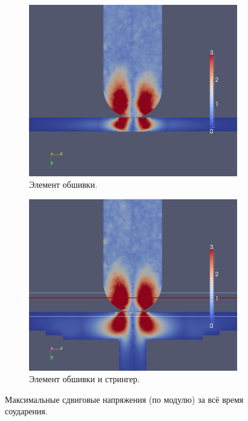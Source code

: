 \begin{figure}[htp]
\begin{subfigure}[b]{0.5\textwidth}
\centering
\includegraphics[width=\textwidth]{png/pkm-experiment/wing-only/shear.png}
\caption{Элемент обшивки.}
\end{subfigure}
\begin{subfigure}[b]{0.5\textwidth}
\centering
\includegraphics[width=\textwidth]{png/pkm-experiment/wing-stringer/shear.png}
\caption{Элемент обшивки и стрингер.}
\end{subfigure}
\caption{Максимальные сдвиговые напряжения (по модулю) за всё время соударения.}
\label{pic:pkm_experiment_shear}
\end{figure}

